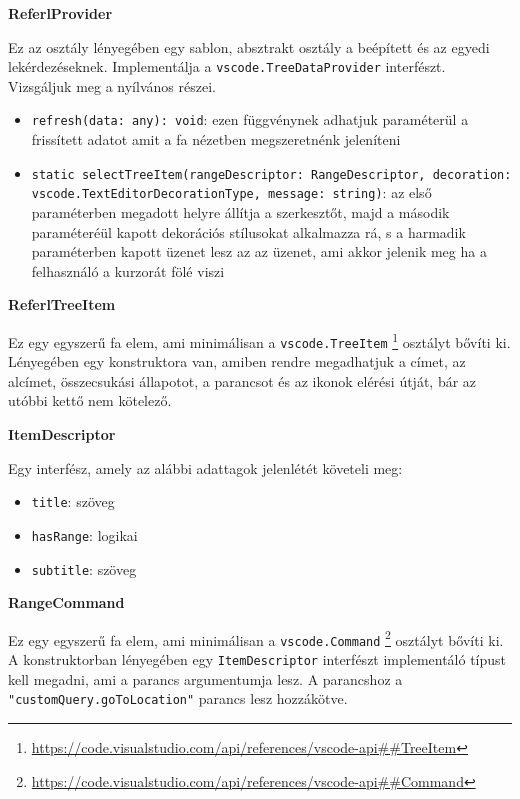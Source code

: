 \vspace{14pt}
\noindent \textbf{ReferlProvider}


\noindent Ez az osztály lényegében egy sablon, absztrakt osztály a beépített és az egyedi lekérdezéseknek. Implementálja a \lstinline{vscode.TreeDataProvider} interfészt. Vizsgáljuk meg a nyílvános részei.

\begin{itemize}
    \item \lstinline{refresh(data: any): void}: ezen függvénynek adhatjuk paraméterül a frissített adatot amit a fa nézetben megszeretnénk jeleníteni
    
    \item \lstinline{static selectTreeItem(rangeDescriptor: RangeDescriptor, decoration: vscode.TextEditorDecorationType, message: string)}: az első paraméterben megadott helyre állítja a szerkesztőt, majd a második paraméteréül kapott dekorációs stílusokat alkalmazza rá, s a harmadik paraméterben kapott üzenet lesz az az üzenet, ami akkor jelenik meg ha a felhasználó a kurzorát fölé viszi
\end{itemize}


\vspace{14pt}
\noindent \textbf{ReferlTreeItem}


\noindent Ez egy egyszerű fa elem, ami minimálisan a \lstinline{vscode.TreeItem} \footnote{\url{https://code.visualstudio.com/api/references/vscode-api##TreeItem}} osztályt bővíti ki. Lényegében egy konstruktora van, amiben rendre megadhatjuk a címet, az alcímet, összecsukási állapotot, a parancsot és az ikonok elérési útját, bár az utóbbi kettő nem kötelező.



\vspace{14pt}
\noindent \textbf{ItemDescriptor}


Egy interfész, amely az alábbi adattagok jelenlétét követeli meg:
\begin{itemize}
    \item \lstinline{title}: szöveg
    \item \lstinline{hasRange}: logikai
    \item \lstinline{subtitle}: szöveg
\end{itemize}

\newpage

\vspace{14pt}
\noindent \textbf{RangeCommand}


\noindent Ez egy egyszerű fa elem, ami minimálisan a \lstinline{vscode.Command} \footnote{\url{https://code.visualstudio.com/api/references/vscode-api##Command}} osztályt bővíti ki. 
A konstruktorban lényegében egy \lstinline{ItemDescriptor} interfészt implementáló típust kell megadni, ami a parancs argumentumja lesz. A parancshoz a \lstinline{"customQuery.goToLocation"} parancs lesz hozzákötve.




